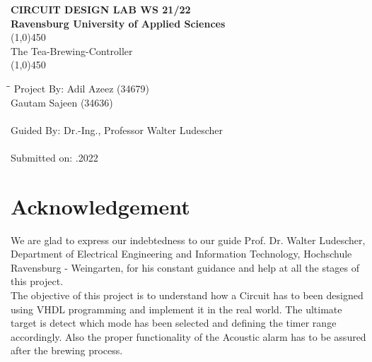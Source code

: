 \documentclass[12pt,a4paper]{article}
\begin{document}
\begin{titlepage}
\begin{center}
\setcounter{page}{1}

\thispagestyle{a}
\vspace*{2cm}
\huge{\textbf{CIRCUIT DESIGN LAB WS 21/22}} \\[4mm]
\Large{\textbf{Ravensburg University of Applied Sciences}}\\ [1.5cm]

\line(1,0){450}\\
The Tea-Brewing-Controller \\
\line(1,0){450}\\ [0.75cm]




\begin{tabbing}
\hspace{6cm}\=\hspace{4.5cm}\=\kill
 Project By: \> Adil Azeez (34679)   \>  \\
  \> Gautam Sajeen (34636) \>   \\ \\
 Guided By: \>Dr.-Ing., Professor Walter Ludescher  \>    \\ 
   \\
 
   Submitted on:   .2022 \> 
\end{tabbing} 


\end{center}
\end{titlepage}

\newpage
\pagestyle{fancy}
\fancyfoot{}
\fancyhead{}

\setlength{\footskip=0pt}
\setlength{\headheight=35pt}

\newpage


\section*{Acknowledgement}

We are glad to express our indebtedness to our guide Prof. Dr. Walter Ludescher, Department of Electrical Engineering and Information Technology, Hochschule Ravensburg - Weingarten, for his constant guidance and help at all the stages of this project.\\

The objective of this project is to understand how a Circuit has to been designed using VHDL programming and implement it in the real world. The ultimate target is detect which mode has been selected and defining the timer range accordingly. Also the proper functionality of the Acoustic alarm has to be assured after the brewing process.\\
\end{document}
